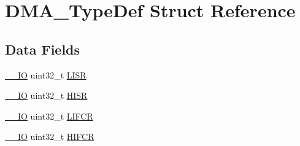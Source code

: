 \hypertarget{struct_d_m_a___type_def}{\section{D\-M\-A\-\_\-\-Type\-Def Struct Reference}
\label{struct_d_m_a___type_def}
}
\subsection*{Data Fields}
\begin{DoxyCompactItemize}
\item 
\hyperlink{group___c_m_s_i_s__core__definitions_gaec43007d9998a0a0e01faede4133d6be}{\-\_\-\-\_\-\-I\-O} uint32\-\_\-t \hyperlink{struct_d_m_a___type_def_a5cdef358e9e95b570358e1f6a3a7f492}{L\-I\-S\-R}
\item 
\hyperlink{group___c_m_s_i_s__core__definitions_gaec43007d9998a0a0e01faede4133d6be}{\-\_\-\-\_\-\-I\-O} uint32\-\_\-t \hyperlink{struct_d_m_a___type_def_a6fe40f7ac1a18c2726b328b5ec02b262}{H\-I\-S\-R}
\item 
\hyperlink{group___c_m_s_i_s__core__definitions_gaec43007d9998a0a0e01faede4133d6be}{\-\_\-\-\_\-\-I\-O} uint32\-\_\-t \hyperlink{struct_d_m_a___type_def_ac4f7bf4cb172024bfc940c00167cd04e}{L\-I\-F\-C\-R}
\item 
\hyperlink{group___c_m_s_i_s__core__definitions_gaec43007d9998a0a0e01faede4133d6be}{\-\_\-\-\_\-\-I\-O} uint32\-\_\-t \hyperlink{struct_d_m_a___type_def_ac55c27aeea4107813c1e7da3fcf46961}{H\-I\-F\-C\-R}
\end{DoxyCompactItemize}


